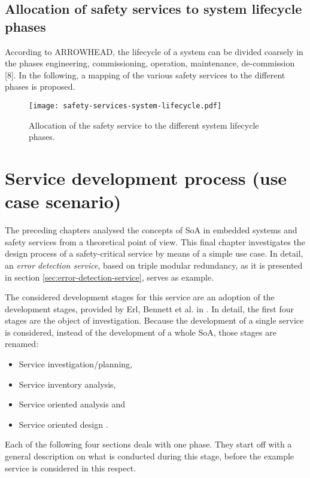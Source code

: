 \subsection{Allocation of safety services to system lifecycle phases}

According to ARROWHEAD, the lifecycle of a system can be divided coarsely in the phases engineering, commissioning, operation, maintenance, de-commission [8]. In the following, a mapping of the various safety services to the different phases is proposed.

\begin{figure}[ht]
\centering
\label{fig:safety-services-system-lifecycle}
\caption{Allocation of the safety service to the different system lifecycle phases.}
\texttt{[image: safety-services-system-lifecycle.pdf]}
\end{figure}







\section{Service development process (use case scenario)}

The preceding chapters analysed the concepts of SoA in embedded systems and safety services from a theoretical point of view. This final chapter investigates the design process of a safety-critical service by means of a simple use case. In detail, an \emph{error detection service}, based on triple modular redundancy, as it is presented in section \ref{sec:error-detection-service}, serves as example.

The considered development stages for this service are an adoption of the development stages, provided by Erl, Bennett et al. in \cite[p.116]{erl2011}. In detail, the first four stages are the object of investigation. Because the development of a single service is considered, instead of the development of a whole SoA, those stages are renamed:
\begin{itemize}
\item Service investigation/planning,
\item Service inventory analysis,
\item Service oriented analysis and
\item Service oriented design \cite[p.116]{erl2011}.
\end{itemize}

Each of the following four sections deals with one phase. They start off with a general description on what is conducted during this stage, before the example service is considered in this respect.




